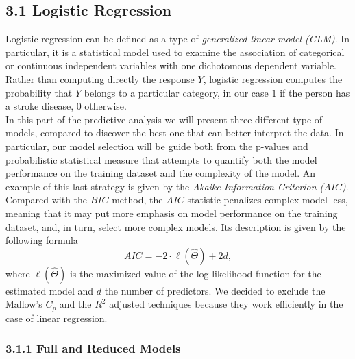 \documentclass[
]{article}
\begin{document}
\hypertarget{logistic-regression}{%
\subsection{3.1 Logistic Regression}\label{logistic-regression}}

Logistic regression can be defined as a type of \emph{generalized linear
model (GLM)}. In particular, it is a statistical model used to examine
the association of categorical or continuous independent variables with
one dichotomous dependent variable.\\
Rather than computing directly the response \(Y\), logistic regression
computes the probability that \(Y\) belongs to a particular category, in
our case \(1\) if the person has a stroke disease, \(0\) otherwise.\\
In this part of the predictive analysis we will present three different
type of models, compared to discover the best one that can better
interpret the data. In particular, our model selection will be guide
both from the p-values and probabilistic statistical measure that
attempts to quantify both the model performance on the training dataset
and the complexity of the model. An example of this last strategy is
given by the \emph{Akaike Information Criterion (\(AIC\))}.\\
Compared with the \(BIC\) method, the \(AIC\) statistic penalizes
complex model less, meaning that it may put more emphasis on model
performance on the training dataset, and, in turn, select more complex
models. Its description is given by the following formula
\[ AIC = -2 \cdot \ell(\hat \Theta ) + 2d,\] where
\(\ell(\hat \Theta )\) is the maximized value of the log-likelihood
function for the estimated model and \(d\) the number of predictors. We
decided to exclude the Mallow's \(C_p\) and the \(R^2\) adjusted
techniques because they work efficiently in the case of linear
regression.

\hypertarget{full-and-reduced-models}{%
\subsubsection{3.1.1 Full and Reduced
Models}\label{full-and-reduced-models}}
\end{document}
